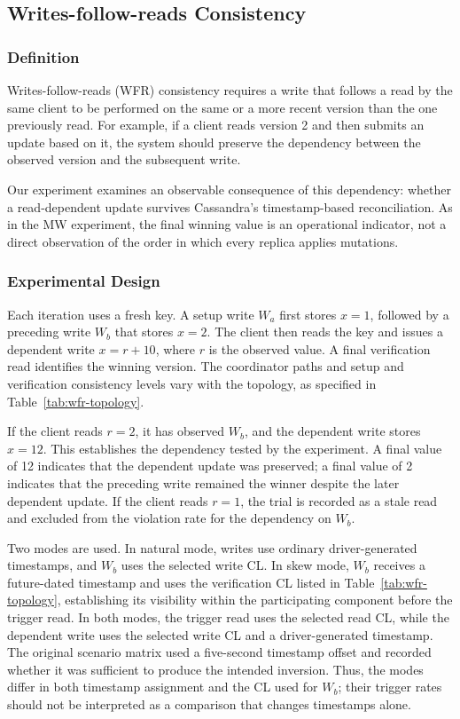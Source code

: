 \subsection{Writes-follow-reads Consistency}\label{wfr:writes-follow-reads-consistency}

\subsubsection{Definition}\label{wfr:definition}

Writes-follow-reads (WFR) consistency requires a write that follows a read by the same client to be performed on the same or a more recent version than the one previously read. For example, if a client reads version 2 and then submits an update based on it, the system should preserve the dependency between the observed version and the subsequent write.

Our experiment examines an observable consequence of this dependency: whether a read-dependent update survives Cassandra's timestamp-based reconciliation. As in the MW experiment, the final winning value is an operational indicator, not a direct observation of the order in which every replica applies mutations.

\subsubsection{Experimental Design}\label{wfr:experimental-design}

Each iteration uses a fresh key. A setup write $W_a$ first stores $x=1$, followed by a preceding write $W_b$ that stores $x=2$. The client then reads the key and issues a dependent write $x=r+10$, where $r$ is the observed value. A final verification read identifies the winning version. The coordinator paths and setup and verification consistency levels vary with the topology, as specified in Table~\ref{tab:wfr-topology}.

If the client reads $r=2$, it has observed $W_b$, and the dependent write stores $x=12$. This establishes the dependency tested by the experiment. A final value of 12 indicates that the dependent update was preserved; a final value of 2 indicates that the preceding write remained the winner despite the later dependent update. If the client reads $r=1$, the trial is recorded as a stale read and excluded from the violation rate for the dependency on $W_b$.

Two modes are used. In natural mode, writes use ordinary driver-generated timestamps, and $W_b$ uses the selected write CL. In skew mode, $W_b$ receives a future-dated timestamp and uses the verification CL listed in Table~\ref{tab:wfr-topology}, establishing its visibility within the participating component before the trigger read. In both modes, the trigger read uses the selected read CL, while the dependent write uses the selected write CL and a driver-generated timestamp. The original scenario matrix used a five-second timestamp offset and recorded whether it was sufficient to produce the intended inversion. Thus, the modes differ in both timestamp assignment and the CL used for $W_b$; their trigger rates should not be interpreted as a comparison that changes timestamps alone.

